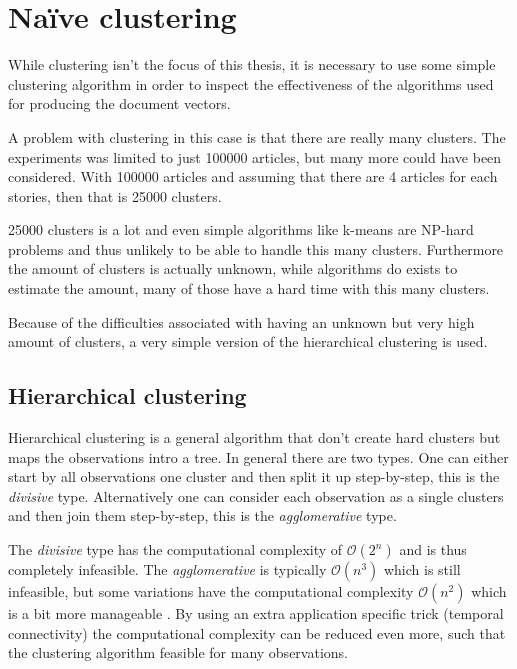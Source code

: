 \section{Naïve clustering}

While clustering isn't the focus of this thesis, it is necessary to use some simple clustering algorithm in order to inspect the effectiveness of the algorithms used for producing the document vectors.

A problem with clustering in this case is that there are really many clusters. The experiments was limited to just 100000 articles, but many more could have been considered. With 100000 articles and assuming that there are 4 articles for each stories, then that is 25000 clusters.

25000 clusters is a lot and even simple algorithms like k-means are NP-hard problems and thus unlikely to be able to handle this many clusters. Furthermore the amount of clusters is actually unknown, while algorithms do exists to estimate the amount, many of those have a hard time with this many clusters.

Because of the difficulties associated with having an unknown but very high amount of clusters, a very simple version of the hierarchical clustering is used.

\subsection{Hierarchical clustering}

Hierarchical clustering is a general algorithm that don't create hard clusters but maps the observations intro a tree. In general there are two types. One can either start by all observations one cluster and then split it up step-by-step, this is the \textit{divisive} type. Alternatively one can consider each observation as a single clusters and then join them step-by-step, this is the \textit{agglomerative} type.

The \textit{divisive} type has the computational complexity of $\mathcal{O}(2^n)$ and is thus completely infeasible. The \textit{agglomerative} is typically $\mathcal{O}(n^3)$ which is still infeasible, but some variations have the computational complexity $\mathcal{O}(n^2)$ which is a bit more manageable \cite{wiki-hcluster}. By using an extra application specific trick (temporal connectivity) the computational complexity can be reduced even more, such that the clustering algorithm feasible for many observations.

